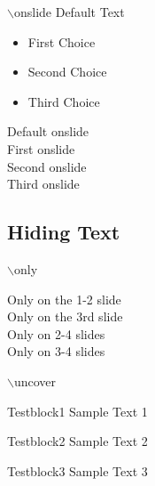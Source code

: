 \documentclass{beamer}
\begin{document}
    \begin{frame}[label=Test_label]{$\backslash$onslide}
        Default Text
        \begin{itemize}
            
            \item<2-> First Choice
            \item<3-> Second Choice
            \item<4-> Third Choice
        \end{itemize}
         Default onslide \\
         First onslide \\
         Second onslide \\
         Third onslide \\
    \end{frame}
    
    \subsection{Hiding Text}
    
    \begin{frame}{$\backslash$only}
    
         {Only on the 1-2 slide\\}
         {Only on the 3rd slide\\} 
         {Only on 2-4 slides\\} 
         {Only on 3-4 slides\\} 
        
    \end{frame}
    
    \begin{frame}{$\backslash$uncover}
         {
            \begin{alertblock}{Testblock1}
                Sample Text 1
            \end{alertblock}
        }
         {
            \begin{alertblock}{Testblock2}
                Sample Text 2
            \end{alertblock}
        }
         {
            \begin{alertblock}{Testblock3}
                Sample Text 3
            \end{alertblock}
        }
        
    \end{frame}
    
\end{document}
